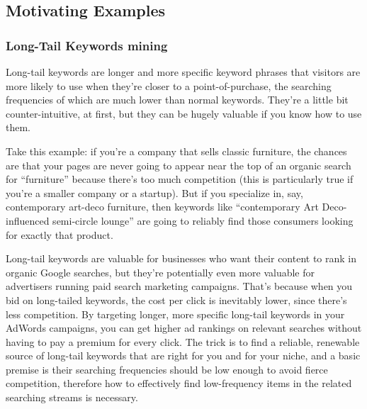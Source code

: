 \documentclass[conference]{IEEEtran}
\begin{document}
\subsection{Motivating Examples}
\subsubsection{Long-Tail Keywords mining}
Long-tail keywords are longer and more specific keyword phrases that visitors are more likely to use when they're closer to a point-of-purchase, the searching frequencies of which are much lower than normal keywords. They're a little bit counter-intuitive, at first, but they can be hugely valuable if you know how to use them.\par
Take this example: if you're a company that sells classic furniture, the chances are that your pages are never going to appear near the top of an organic search for ``furniture'' because there's too much competition (this is particularly true if you're a smaller company or a startup). But if you specialize in, say, contemporary art-deco furniture, then keywords like ``contemporary Art Deco-influenced semi-circle lounge'' are going to reliably find those consumers looking for exactly that product.\par
Long-tail keywords are valuable for businesses who want their content to rank in organic Google searches, but they're potentially even more valuable for advertisers running paid search marketing campaigns. That's because when you bid on long-tailed keywords, the cost per click is inevitably lower, since there's less competition. By targeting longer, more specific long-tail keywords in your AdWords campaigns, you can get higher ad rankings on relevant searches without having to pay a premium for every click. The trick is to find a reliable, renewable source of long-tail keywords that are right for you and for your niche, and a basic premise is their searching frequencies should be low enough to avoid fierce competition, therefore how to effectively find low-frequency items in the related searching streams is necessary.  
\end{document}
